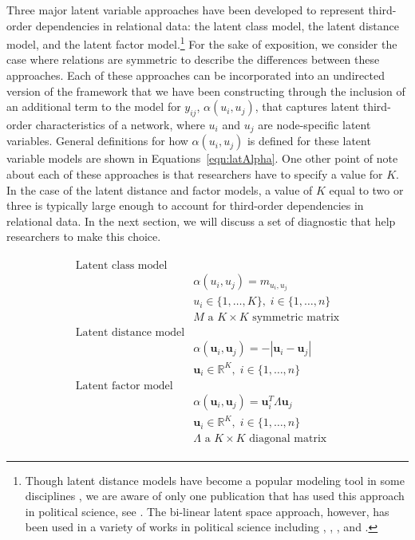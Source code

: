 \documentclass[12pt,onesided,pdflatex]{amsart}
\begin{document}
Three major latent variable approaches have been developed to represent third-order dependencies in relational data: the latent class model, the latent distance model, and the latent factor model.\footnote{Though latent distance models have become a popular modeling tool in some disciplines \citep{salter:etal:2012}, we are aware of only one publication that has used this approach in political science, see \citet{kirkland:2012}. The bi-linear latent space approach, however, has been used in a variety of works in political science including \citet{ward:etal:2007}, \citet{cao:2009}, \citet{breunig:etal:2012}, and \citet{metternich:etal:2015}.} For the sake of exposition, we consider the case where relations are symmetric to describe the differences between these approaches. Each of these approaches can be incorporated into an undirected version of the framework that we have been constructing through the inclusion of an additional term to the model for $y_{ij}$, $\alpha(u_{i}, u_{j})$, that captures latent third-order characteristics of a network, where $u_{i}$ and $u_{j}$ are node-specific latent variables. General definitions for how $\alpha(u_{i}, u_{j})$ is defined for these latent variable models are shown in Equations~\ref{eqn:latAlpha}. One other point of note about each of these approaches is that researchers have to specify a value for $K$. In the case of the latent distance and factor models, a value of $K$ equal to two or three is typically large enough to account for third-order dependencies in relational data. In the next section, we will discuss a set of diagnostic that help researchers to make this choice.

\begin{align}
\begin{aligned}
\text{Latent class model} \\
	&\alpha(u_{i}, u_{j}) = m_{u_{i}, u_{j}} \\
	&u_{i} \in \{1, \ldots, K \}, \; i \in \{1,\ldots, n\} \\
	&M \text{ a } K \times K \text{ symmetric matrix} \\
\text{Latent distance model} \\
	&\alpha(\textbf{u}_{i}, \textbf{u}_{j}) = -|\textbf{u}_{i} - \textbf{u}_{j}| \\
	&\textbf{u}_{i} \in \mathbb{R}^{K}, \; i \in \{1, \ldots, n \} \\
\text{Latent factor model} \\
	&\alpha(\textbf{u}_{i}, \textbf{u}_{j}) = \textbf{u}_{i}^{T} \Lambda \textbf{u}_{j} \\
	&\textbf{u}_{i} \in \mathbb{R}^{K}, \; i \in \{1, \ldots, n \} \\
	&\Lambda \text{ a } K \times K \text{ diagonal matrix}
\label{eqn:latAlpha}
\end{aligned}
\end{align}
\end{document}
